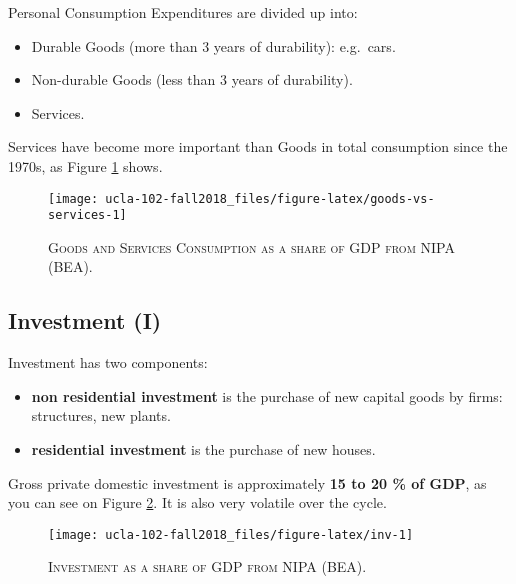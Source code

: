 \documentclass[]{book}
\providecommand{\tightlist}{%
  \setlength{\itemsep}{0pt}\setlength{\parskip}{0pt}}
\theoremstyle{definition}
\theoremstyle{definition}
\theoremstyle{definition}
\theoremstyle{remark}
\begin{document}
Personal Consumption Expenditures are divided up into:

\begin{itemize}
\tightlist
\item
  Durable Goods (more than 3 years of durability): e.g.~cars.
\item
  Non-durable Goods (less than 3 years of durability).
\item
  Services.
\end{itemize}

Services have become more important than Goods in total consumption
since the 1970s, as Figure \ref{fig:goods-vs-services} shows.




\begin{figure}

{\centering \texttt{[image: ucla-102-fall2018\_files/figure-latex/goods-vs-services-1]} 

}

\caption{\textsc{Goods and Services Consumption as
a share of GDP from NIPA (BEA)}.}\label{fig:goods-vs-services}
\end{figure}

\hypertarget{inv}{\subsection{Investment (I)}\label{inv}}

Investment has two components:

\begin{itemize}
\tightlist
\item
  \textbf{non residential investment} is the purchase of new capital
  goods by firms: structures, new plants.
\item
  \textbf{residential investment} is the purchase of new houses.
\end{itemize}

Gross private domestic investment is approximately \textbf{15 to 20 \%
of GDP}, as you can see on Figure \ref{fig:inv}. It is also very
volatile over the cycle.



\begin{figure}

{\centering \texttt{[image: ucla-102-fall2018\_files/figure-latex/inv-1]} 

}

\caption{\textsc{Investment as a share of GDP from NIPA (BEA)}.}\label{fig:inv}
\end{figure}
\end{document}
